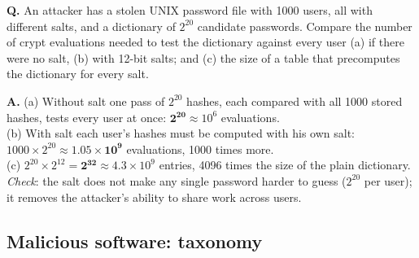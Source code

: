 \begin{worked}
\textbf{Q.} An attacker has a stolen UNIX password file with 1000 users, all with different salts, and a dictionary of $2^{20}$ candidate passwords. Compare the number of crypt evaluations needed to test the dictionary against every user (a) if there were no salt, (b) with 12-bit salts; and (c) the size of a table that precomputes the dictionary for every salt.

\textbf{A.} (a) Without salt one pass of $2^{20}$ hashes, each compared with all 1000 stored hashes, tests every user at once: $\mathbf{2^{20}} \approx 10^6$ evaluations.\\
(b) With salt each user's hashes must be computed with his own salt: $1000 \times 2^{20} \approx \mathbf{1.05 \times 10^{9}}$ evaluations, 1000 times more.\\
(c) $2^{20} \times 2^{12} = \mathbf{2^{32}} \approx 4.3 \times 10^{9}$ entries, 4096 times the size of the plain dictionary.\\
\emph{Check}: the salt does not make any single password harder to guess ($2^{20}$ per user); it removes the attacker's ability to share work across users.
\end{worked}

\subsection{Malicious software: taxonomy \hot\new}

